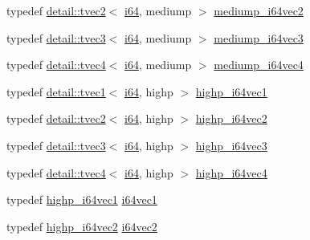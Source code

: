 \begin{DoxyCompactItemize}
\item 
typedef \hyperlink{structglm_1_1detail_1_1tvec2}{detail\+::tvec2}$<$ \hyperlink{group__gtc__type__precision_gac7a7eaad46064fc952b06df33689da23}{i64}, mediump $>$ \hyperlink{group__gtc__type__precision_ga5cf0bec13b01b6124e966360cffe15a4}{mediump\+\_\+i64vec2}
\item 
typedef \hyperlink{structglm_1_1detail_1_1tvec3}{detail\+::tvec3}$<$ \hyperlink{group__gtc__type__precision_gac7a7eaad46064fc952b06df33689da23}{i64}, mediump $>$ \hyperlink{group__gtc__type__precision_gae1aa82d2b9a62a87648306205dfe69ab}{mediump\+\_\+i64vec3}
\item 
typedef \hyperlink{structglm_1_1detail_1_1tvec4}{detail\+::tvec4}$<$ \hyperlink{group__gtc__type__precision_gac7a7eaad46064fc952b06df33689da23}{i64}, mediump $>$ \hyperlink{group__gtc__type__precision_gab4db11ebb425fa18fe5d15d455c360a3}{mediump\+\_\+i64vec4}
\item 
typedef \hyperlink{structglm_1_1detail_1_1tvec1}{detail\+::tvec1}$<$ \hyperlink{group__gtc__type__precision_gac7a7eaad46064fc952b06df33689da23}{i64}, highp $>$ \hyperlink{group__gtc__type__precision_ga06c21aba992669f5c160ec5f5a480522}{highp\+\_\+i64vec1}
\item 
typedef \hyperlink{structglm_1_1detail_1_1tvec2}{detail\+::tvec2}$<$ \hyperlink{group__gtc__type__precision_gac7a7eaad46064fc952b06df33689da23}{i64}, highp $>$ \hyperlink{group__gtc__type__precision_gabfe3aa6fa4003a47577beb9678ab2661}{highp\+\_\+i64vec2}
\item 
typedef \hyperlink{structglm_1_1detail_1_1tvec3}{detail\+::tvec3}$<$ \hyperlink{group__gtc__type__precision_gac7a7eaad46064fc952b06df33689da23}{i64}, highp $>$ \hyperlink{group__gtc__type__precision_ga4030f8ad15da56f5e427aa457d39e888}{highp\+\_\+i64vec3}
\item 
typedef \hyperlink{structglm_1_1detail_1_1tvec4}{detail\+::tvec4}$<$ \hyperlink{group__gtc__type__precision_gac7a7eaad46064fc952b06df33689da23}{i64}, highp $>$ \hyperlink{group__gtc__type__precision_ga0ea279cd954fbb71a1db62e897d4d7f5}{highp\+\_\+i64vec4}
\item 
typedef \hyperlink{group__gtc__type__precision_ga06c21aba992669f5c160ec5f5a480522}{highp\+\_\+i64vec1} \hyperlink{group__gtc__type__precision_ga8bc234da7e4a6436e01241f439fc7ddd}{i64vec1}
\item 
typedef \hyperlink{group__gtc__type__precision_gabfe3aa6fa4003a47577beb9678ab2661}{highp\+\_\+i64vec2} \hyperlink{group__gtc__type__precision_ga75461c98baf3e3913566550bd9d8d17f}{i64vec2}
\item 

\end{DoxyCompactItemize}
